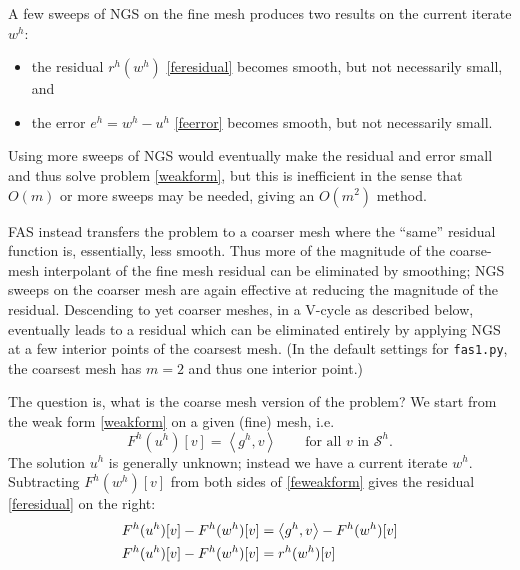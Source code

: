 \documentclass[letterpaper,final,12pt,reqno]{amsart}
\newcommand{\ip}[2]{\left<#1,#2\right>}
\begin{document}
A few sweeps of NGS on the fine mesh produces two results on the current iterate $w^h$:
\begin{itemize}
\item the residual $r^h(w^h)$ \eqref{feresidual} becomes smooth, but not necessarily small, and
\item the error $e^h = w^h - u^h$ \eqref{feerror} becomes smooth, but not necessarily small.
\end{itemize}
Using more sweeps of NGS would eventually make the residual and error small and thus solve problem \eqref{weakform}, but this is inefficient in the sense that $O(m)$ or more sweeps may be needed, giving an $O(m^2)$ method.

FAS instead transfers the problem to a coarser mesh where the ``same'' residual function is, essentially, less smooth.  Thus more of the magnitude of the coarse-mesh interpolant of the fine mesh residual can be eliminated by smoothing; NGS sweeps on the coarser mesh are again effective at reducing the magnitude of the residual.  Descending to yet coarser meshes, in a V-cycle as described below, eventually leads to a residual which can be eliminated entirely by applying NGS at a few interior points of the coarsest mesh.  (In the default settings for \texttt{fas1.py}, the coarsest mesh has $m=2$ and thus one interior point.)

The question is, what is the coarse mesh version of the problem?  We start from the weak form \eqref{weakform} on a given (fine) mesh, i.e.
\begin{equation}
  F^h(u^h)[v] = \ip{g^h}{v} \qquad \text{for all } v \text{ in } \mathcal{S}^h.  \label{feweakform}
\end{equation}
The solution $u^h$ is generally unknown; instead we have a current iterate $w^h$.  Subtracting $F^h(w^h)[v]$ from both sides of \eqref{feweakform} gives the residual \eqref{feresidual} on the right:
\begin{align}
  F^h(u^h)[v] - F^h(w^h)[v] &= \ip{g^h}{v} - F^h(w^h)[v] \notag \\
  F^h(u^h)[v] - F^h(w^h)[v] &= r^h(w^h)[v] \label{fasproto}
\end{align}
\end{document}
